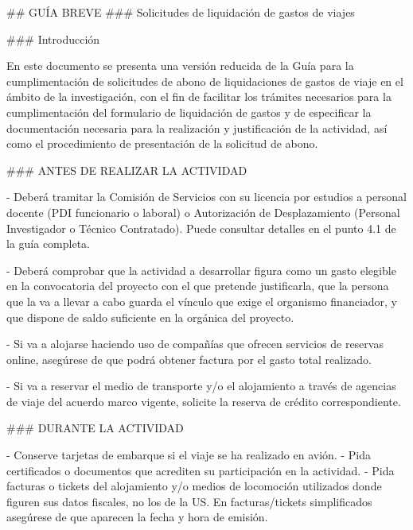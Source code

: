 \documentclass{article}
\begin{document}
\begin{itemize}
\begin{itemize}
\begin{scriptsize}
                  \#\# GUÍA BREVE
                  \#\#\# Solicitudes de liquidación de gastos de viajes

                  \#\#\# Introducción

                  En este documento se presenta una versión reducida de la Guía para la cumplimentación de solicitudes de abono de liquidaciones de gastos de viaje en el ámbito de la investigación, con el fin de facilitar los trámites necesarios para la cumplimentación del formulario de liquidación de gastos y de especificar la documentación necesaria para la realización y justificación de la actividad, así como el procedimiento de presentación de la solicitud de abono.

                  \#\#\# ANTES DE REALIZAR LA ACTIVIDAD

                  - Deberá tramitar la Comisión de Servicios con su licencia por estudios a personal docente (PDI funcionario o laboral) o Autorización de Desplazamiento (Personal Investigador o Técnico Contratado). Puede consultar detalles en el punto 4.1 de la guía completa.

                  - Deberá comprobar que la actividad a desarrollar figura como un gasto elegible en la convocatoria del proyecto con el que pretende justificarla, que la persona que la va a llevar a cabo guarda el vínculo que exige el organismo financiador, y que dispone de saldo suficiente en la orgánica del proyecto.

                  - Si va a alojarse haciendo uso de compañías que ofrecen servicios de reservas online, asegúrese de que podrá obtener factura por el gasto total realizado.

                  - Si va a reservar el medio de transporte y/o el alojamiento a través de agencias de viaje del acuerdo marco vigente, solicite la reserva de crédito correspondiente.

                  \#\#\# DURANTE LA ACTIVIDAD

                  - Conserve tarjetas de embarque si el viaje se ha realizado en avión.
                  - Pida certificados o documentos que acrediten su participación en la actividad.
                  - Pida facturas o tickets del alojamiento y/o medios de locomoción utilizados donde figuren sus datos fiscales, no los de la US. En facturas/tickets simplificados asegúrese de que aparecen la fecha y hora de emisión.
                \end{scriptsize}
        \end{itemize}



\end{itemize}
\end{document}
